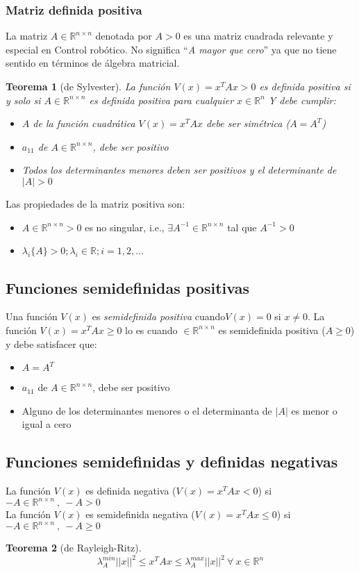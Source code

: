 \documentclass[12pt,spanish,lettersize]{report}
\newtheorem{teo}{Teorema}[section]
\begin{document}
\subsubsection{Matriz definida positiva}
La matriz $A\in\mathbb{R}^{n\times n}$ denotada por $A>0$ es una matriz cuadrada relevante y especial en Control rob\'otico. No significa ``\emph{A mayor que cero}'' ya que no tiene sentido en t\'erminos de \'algebra matricial.
\begin{teo}[de Sylvester]
La funci\'on $V(x)=x^TAx>0$ es definida positiva si y solo si $A\in\mathbb{R}^{n\times n}$ es definida positiva para cualquier $x\in\mathbb{R}^n$ Y debe cumplir:
\begin{itemize}
\item $A$ de la funci\'on cuadr\'atica $V(x)=x^TAx$ debe ser sim\'etrica ($A=A^T$)
\item $a_{11}$ de $A\in\mathbb{R}^{n\times n}$, debe ser positivo
\item Todos los determinantes menores deben ser positivos y el determinante de $|A|>0$
\end{itemize}
\end{teo}
Las propiedades de la matriz positiva son:
\begin{itemize}
\item $A\in\mathbb{R}^{n\times n}>0$ es no singular, i.e., $\exists A^{-1}\in\mathbb{R}^{n\times n}$ tal que $A^{-1}>0$
\item $\lambda_i\{A\}>0; \lambda_i\in\mathbb{R}; i=1, 2, \dots$
\end{itemize}
\subsection{Funciones semidefinidas positivas}
Una funci\'on $V(x)$ es \emph{semidefinida positiva} cuando$V(x)=0$ si $x\ne 0$. La funci\'on $V(x)=x^TAx\ge 0$ lo es cuando $\in\mathbb{R}^{n\times n}$ es semidefinida positiva ($A\ge 0$) y debe satisfacer que:
\begin{itemize}
\item $A=A^T$
\item $a_{11}$ de $A\in\mathbb{R}^{n\times n}$, debe ser positivo
\item Alguno de los determinantes menores o el determinanta de $|A|$ es menor o igual a cero
\end{itemize}
\subsection{Funciones semidefinidas y definidas negativas}
La funci\'on $V(x)$ es definida negativa ($V(x)=x^TAx<0$) si $-A\in\mathbb{R}^{n\times n}\ ,\ -A>0$\\
La funci\'on $V(x)$ es semidefinida negativa ($V(x)=x^TAx\le 0$) si $-A\in\mathbb{R}^{n\times n}\ ,\ -A\ge 0$
\begin{teo}[de Rayleigh-Ritz]
\begin{equation}
\lambda_A^{min}||x||^2\le x^TAx\le\lambda_A^{max}||x||^2\ \forall\ x\in\mathbb{R}^n
\end{equation}
\end{teo}
\end{document}

